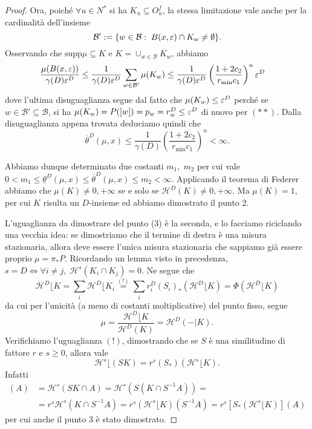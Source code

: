 \begin{proof}
	Ora, poiché $\forall u\in N^{*}$ si ha $K_{u}\subseteq O_{u}^{f}$, la stessa limitazione vale anche per la cardinalità dell'insieme 
	$$\mathcal B':=\{w\in\mathcal B:\; B(x,\varepsilon)\cap K_{w}\neq \emptyset\}.$$
	Osservando che $\text{supp}\mu\subseteq K$ e $K = \cup_{w\in\mathcal B}K_{w}$, abbiamo 
	\begin{align*}
		\frac{\mu(B(x,\varepsilon))}{\gamma(D)\varepsilon^{D}} & \leq
		\frac{1}{\gamma(D)\varepsilon^{D}}\sum_{w\in\mathcal B'}\mu(K_{w})\leq
		\frac{1}{\gamma(D)\varepsilon^{D}} \left(\frac{1+2c_{2}}{r_{\min}c_{1}}\right)^{n}\varepsilon^{D}
	\end{align*}
	dove l'ultima disuguaglianza segue dal fatto che $\mu(K_{w})\leq\varepsilon^{D}$ perché se $w\in\mathcal B'\subseteq \mathcal B$, si ha $\mu(K_{w}) = P([w]) = p_{w} = r_{w}^{D}\leq \varepsilon^{D}$ di nuovo per $(**)$.
	Dalla disuguaglianza appena trovata deduciamo quindi che 
	$$\overline\theta^{D}(\mu,x) \leq \frac{1}{\gamma(D)}\left(\frac{1+2c_{2}}{r_{\min}c_{1}}\right)^{n} <\infty.$$
	
	Abbiamo dunque determinato due costanti $m_{1},\; m_{2}$ per cui vale $0<m_{1}\leq\underline\theta^{D}(\mu,x)\leq\overline\theta^{D}(\mu,x)\leq m_{2}<\infty$. Applicando il teorema di Federer abbiamo che $\mu(K) \neq 0,+\infty$ se e solo se $\mathcal H^{D}(K)\neq0, +\infty$. 
	Ma $\mu(K) = 1$, per cui $K$ risulta un $D$-insieme ed abbiamo dimostrato il punto 2.
	
	L'uguaglianza da dimostrare del punto (3) è la seconda, e lo facciamo riciclando una vecchia idea: se dimostriamo che il termine di destra è una misura stazionaria, allora deve essere l'unica misura stazionaria che sappiamo già essere proprio $\mu = \pi_{*}P$. Ricordando un lemma visto in precedenza, $s = D \iff \forall i\neq j,\; \mathcal H^{s}(K_{i}\cap K_{j}) = 0$.
	Ne segue che 
	$$\mathcal H^{D}\lfloor K = \sum_{i}\mathcal H^{D}\lfloor K_{i} \overset{(!)}{=} \sum_{i} r_{i}^{D}(S_{i})_{*}(\mathcal H^{D}\lfloor K) = \Phi(\mathcal H^{D}\lfloor K)$$
	da cui per l'unicità (a meno di costanti moltiplicative) del punto fisso, segue 
	$$\mu = \frac{\mathcal H^{D}\lfloor K}{\mathcal H^{D}(K)} = \mathcal H^{D}(-|K).$$
	Verifichiamo l'uguaglianza $(!)$, dimostrando che se $S$ è una similitudine di fattore $r$ e $s\geq0$, allora vale 
	$$\mathcal H^{s}\lfloor(SK) = r^{s}(S_{*})(\mathcal H^{s}\lfloor K).$$
	Infatti 
	\begin{align*}
	[\mathcal H^{s}\lfloor(SK)](A)& = \mathcal H^{s}(SK\cap A) = \mathcal H^{s}(S(K\cap S^{-1}A))= \\ 
	&= r^{s}\mathcal H^{s}(K\cap S^{-1}A) = r^{s}(\mathcal H^{s}\lfloor K)(S^{-1}A) = r^{s}[S_{*}(\mathcal H^{s}\lfloor K)](A)
	\end{align*}
	per cui anche il punto 3 è stato dimostrato.
	

\end{proof}
